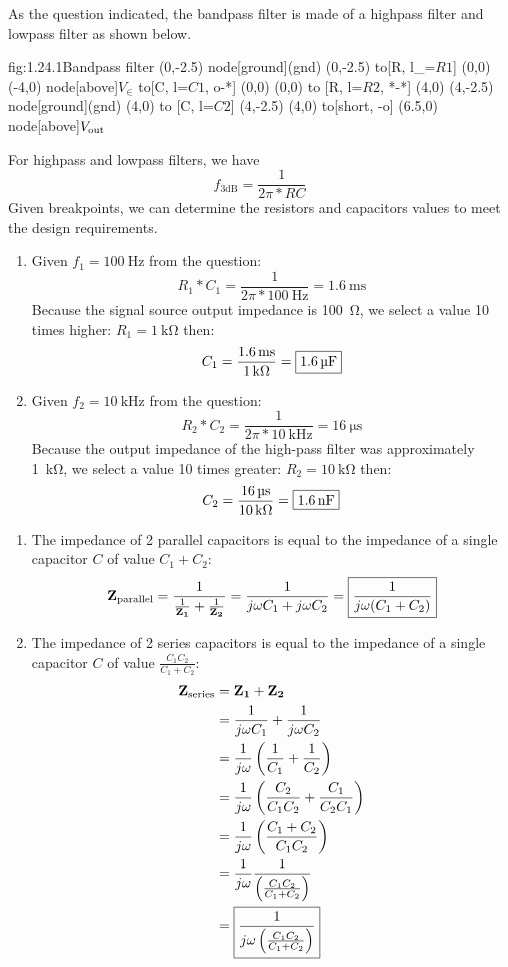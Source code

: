 As the question indicated, the bandpass filter is made of a highpass filter and lowpass filter as shown below.
\begin{circuit}{fig:1.24.1}{Bandpass filter}
    (0,-2.5) node[ground](gnd){}
    (0,-2.5) to[R, l_=$R1$] (0,0)
    (-4,0) node[above]{$V_\in$} to[C, l=$C1$, o-*] (0,0)
    (0,0) to [R, l=$R2$, *-*] (4,0)
    (4,-2.5) node[ground](gnd){}
    (4,0) to [C, l=$C2$] (4,-2.5)
    (4,0) to[short, -o] (6.5,0) node[above]{$V_{\text{out}}$}
\end{circuit}
For highpass and lowpass filters, we have \[ f_\text{3dB} = \frac{1}{2\pi*RC}\] 
Given breakpoints, we can determine the resistors and capacitors values to meet the design requirements.
\begin{enumerate}
    \item
    Given $f_1 = \SI{100}{\Hz}$ from the question:
    \[R_1*C_1 = \frac{1}{2\pi*\SI{100}{\Hz}} = \SI{1.6}{\ms} \]
    Because the signal source output impedance is \SI{100}{\ohm},
    we select a value 10 times higher: $R_1 = \SI{1}{\kohm}$ then:
    \[C_1 = \frac{\SI{1.6}{\ms}}{\SI{1}{\kohm}} = \mans{\SI{1.6}{\micro\farad}}\]
    \item
    Given $f_2 = \SI{10}{\kHz}$ from the question:
    \[R_2*C_2 = \frac{1}{2\pi*\SI{10}{\kHz}} = \SI{16}{\us} \]
    Because the output impedance of the high-pass filter was approximately \SI{1}{\kohm},
    we select a value 10 times greater: $R_2 = \SI{10}{\kohm}$  then:
    \[C_2 = \frac{\SI{16}{\us}}{\SI{10}{\kohm}} = \mans{\SI{1.6}{\nano\farad}}\]
\end{enumerate}

\begin{enumerate}
    \item
    The impedance of 2 parallel capacitors is equal to the impedance of a single capacitor $C$ of value $C_1 + C_2$:
    \[ \mathbf{Z_\text{parallel}} = \frac{1}{ \frac{1}{\mathbf{Z_1}} + \frac{1}{\mathbf{Z_2}} } = \frac{1}{ j\omega C_1 + j\omega C_2 } = \boxed{\frac{1}{j\omega (C_1 + C_2)}} \]
    
    \item
    The impedance of 2 series capacitors is equal to the impedance of a single capacitor $C$ of value $\frac{C_1 C_2}{C_1 + C_2}$:
    \begin{align*}
        \mathbf{Z_{\text{series}}} &= \mathbf{Z_1} + \mathbf{Z_2} \\
        &=  \frac{1}{j\omega C_1} + \frac{1}{j\omega C_2} \\
        &= \frac{1}{j\omega} \left( \frac{1}{C_1} + \frac{1}{C_2} \right) \\
        &= \frac{1}{j\omega} \left( \frac{C_2}{C_1 C_2} + \frac{C_1}{C_2 C_1} \right) \\
        &= \frac{1}{j\omega} \left( \frac{C_1 + C_2}{C_1 C_2} \right) \\
        &= \frac{1}{j\omega} \frac{1}{\left( \frac{C_1 C_2}{C_1 + C_2} \right)} \\
        &= \boxed{ \frac{1}{j\omega\left( \frac{C_1 C_2}{C_1 + C_2} \right)}}
    \end{align*}
\end{enumerate}

